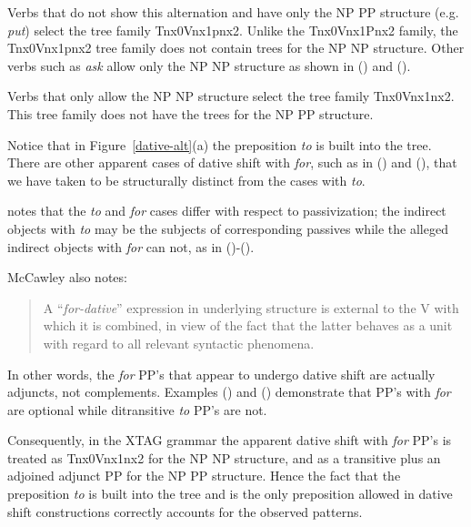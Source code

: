 Verbs that do not show this alternation and have only the NP PP structure
(e.g. {\it put\/}) select the tree family Tnx0Vnx1pnx2.  Unlike
the Tnx0Vnx1Pnx2 family, the Tnx0Vnx1pnx2 tree family does not contain trees for
the NP NP structure. Other verbs such as {\it ask} allow only the NP
NP structure as shown in () and ().  


Verbs that only allow the NP NP structure select the tree family
Tnx0Vnx1nx2. This tree family does not have the trees for the NP PP
structure. 

Notice that in Figure~\ref{dative-alt}(a) the preposition {\it to\/} is
built into the tree.  There are other apparent cases of dative shift
with {\it for}, such as in () and (), that we have taken to
be structurally distinct from the cases with {\it to}.  


\cite{mccawley88} notes that the {\it to} and {\it for} cases
differ with respect to passivization; the indirect objects with {\it
to} may be the subjects of corresponding passives while the alleged
indirect objects with {\it for} can not, as in ()-().


McCawley also notes:

\begin{quote}
A ``{\it for-dative}'' expression in underlying structure is external
to the V with which it is combined, in view of the fact that the
latter behaves as a unit with regard to all relevant syntactic
phenomena.
\end{quote}


In other words, the {\it for} PP's that appear to undergo dative shift
are actually adjuncts, not complements. Examples () and ()
demonstrate that PP's with {\it for} are
optional while ditransitive {\it to} PP's are not.


Consequently, in the XTAG grammar the apparent dative shift with {\it
for} PP's is treated as Tnx0Vnx1nx2 for the NP NP structure, and as a
transitive plus an adjoined adjunct PP for the NP PP structure.  Hence
the fact that the preposition {\it to} is built into the tree and is
the only preposition allowed in dative shift constructions correctly
accounts for the observed patterns.

